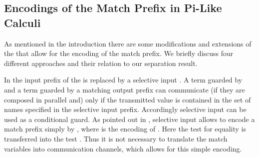 \documentclass[]{article}
\begin{document}
\subsection{Encodings of the Match Prefix in Pi-Like Calculi}
\label{sec:encodeMatchInOtherCalculi}

As mentioned in the introduction there are some modifications and extensions of the \piCal that allow for the encoding of the match prefix. We briefly discuss four different approaches and their relation to our separation result.

In \cite{bodeiDeganoPriami05} the input prefix  of the \piCal is replaced by a selective input . A term guarded by  and a term guarded by a matching output prefix  can communicate (if they are composed in parallel and) only if the transmitted value  is contained in  the set  of names specified in the selective input prefix. Accordingly selective input can be used as a conditional guard. As pointed out in \cite{bodeiDeganoPriami05}, selective input allows to encode a match prefix  simply by , where  is the encoding of . Here the test for equality  is transferred into the test . Thus it is not necessary to translate the match variables into communication channels, which allows for this simple encoding.
\end{document}
